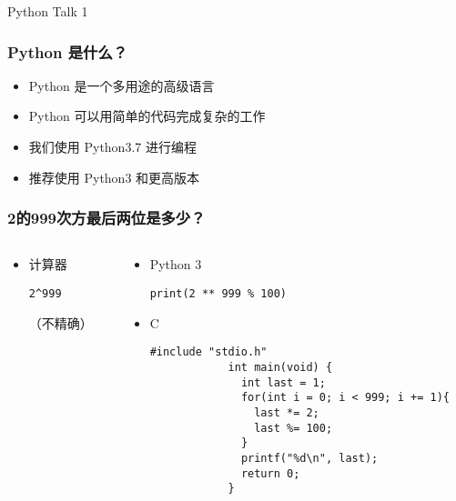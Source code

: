 


\begin{CJK}{UTF8}{gbsn}

\PreFirstFrame
\begin{frame} [fragile]
	\centerline{\fontsize{42}{42}\selectfont Python Talk 1}
\end{frame}
\PostFirstFrame

\begin{frame}
	\frametitle{Python 是什么？}
	\linespread{2}
	\begin{itemize}
	\item Python 是一个多用途的高级语言
	\item Python 可以用简单的代码完成复杂的工作
	\item 我们使用 Python3.7 进行编程
	\item 推荐使用 Python3 和更高版本
	\end{itemize}
\end{frame}

\begin{frame} [fragile]
	\frametitle{2的999次方最后两位是多少？}
	\begin{columns}[T]
		\begin{column}[T]{.25\textwidth}
			\begin{itemize}
			\item 计算器
			\begin{lstlisting}[style=pythonstyle, gobble=12]
			2^999
			\end{lstlisting}
			（不精确）
			\end{itemize}
		\end{column}
		\begin{column}[T]{.75\textwidth}
			\begin{itemize}
			\item Python 3
			\begin{lstlisting}[style=pythonstyle, gobble=12]
			print(2 ** 999 % 100)
			\end{lstlisting}
			\item C
			\begin{lstlisting}[style=cstyle, gobble=12]
			#include "stdio.h"
			int main(void) {
			  int last = 1;
			  for(int i = 0; i < 999; i += 1){
				last *= 2;
				last %= 100;
			  }
			  printf("%d\n", last);
			  return 0;
			}
			\end{lstlisting}
			\end{itemize}
		\end{column}
	\end{columns}
\end{frame}


\end{CJK}
